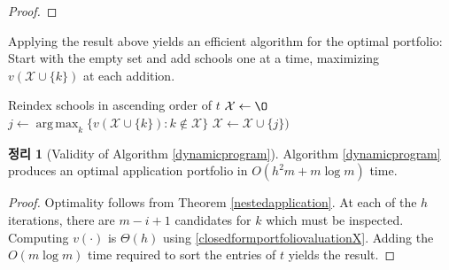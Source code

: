 \documentclass[12pt]{article} %
\DeclareMathOperator*{\argmax}{arg\,max}
\newtheorem{theorem}{Theorem}
\theoremstyle{definition}
\newtheorem{theorem}{정리}
\theoremstyle{definition}
\begin{document}
\begin{proof}
%
%
\end{proof}

Applying the result above yields an efficient algorithm for the optimal portfolio: Start with the empty set and add schools one at a time, maximizing $v(\mathcal{X}\cup \{k\})$ at each addition. 

\begin{algorithm}[H] 
\caption{Optimal portfolio algorithm for Alma’s problem.} \label{dynamicprogram}
\KwData{Utility values $t \in[0, \infty)^m$, admissions probabilities $f \in [0, 1]^m$.}
Reindex schools in ascending order of $t$\;
$\mathcal{X} \gets \O$\;
{
    $j \gets \argmax_k\bigl\{v(\mathcal{X}\cup\{k\}) : k \notin \mathcal{X}\bigr\}$\;
    $\mathcal{X} \gets \mathcal{X}\cup\{j\})$ \;
}
\end{algorithm}

\begin{theorem}[Validity of Algorithm \ref{dynamicprogram}]
Algorithm \ref{dynamicprogram} produces an optimal application portfolio in $O(h^2 m + m \log m)$ time.
\end{theorem}
\begin{proof}
Optimality follows from Theorem \ref{nestedapplication}. At each of the $h$ iterations, there are $m - i +1$ candidates for $k$ which must be inspected. Computing $v(\cdot)$ is $\Theta(h)$ using \eqref{closedformportfoliovaluationX}. Adding the $O(m\log m)$ time required to sort the entries of $t$ yields the result.
\end{proof}
\end{document}
